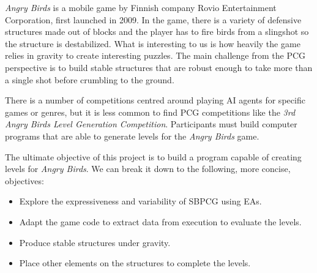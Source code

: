 \documentclass[runningheads,a4paper]{llncs}
\begin{document}
\textit{Angry Birds} is a mobile game by Finnish company Rovio Entertainment 
Corporation\cite{angry-birds}, first launched in 2009. 
In the game, there is a variety of defensive structures made out of blocks 
and the player has to fire birds from a slingshot
so the structure is destabilized.
What is interesting to us is how heavily the 
game relies in gravity to create interesting puzzles. The main challenge from 
the PCG perspective is to build stable structures that are robust enough to 
take more than a single shot before crumbling to the ground.

There is a number of competitions centred around playing AI agents for specific 
games or genres, but it is less common to find PCG competitions like the 
\textit{3rd Angry Birds Level Generation Competition}. Participants must build 
computer programs that are able to generate levels for the \textit{Angry Birds} 
game.



The ultimate objective of this project is to build a program capable of 
creating levels for \textit{Angry Birds}. We can break it down to the 
following, more concise, objectives:

\begin{itemize}
	\item Explore the expressiveness and variability of SBPCG using 
	EAs.
	\item Adapt the game code to extract data from execution to 
	evaluate the levels.
	\item Produce stable structures under gravity.
	\item Place other elements on the structures to complete the levels.
\end{itemize} 
\end{document}
